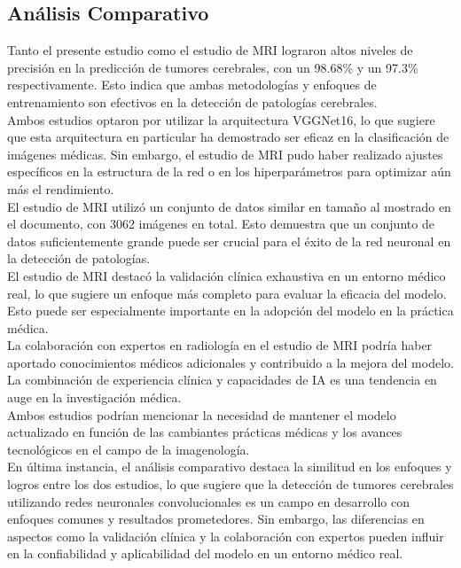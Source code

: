 \documentclass[12pt,twoside,titlepage]{ingenius}
\begin{document}
\begin{multicols}{2}
\subsection{Análisis Comparativo}
Tanto el presente estudio como el estudio de MRI lograron altos niveles de precisión en la predicción de tumores cerebrales, con un 98.68\% y un 97.3\% respectivamente. Esto indica que ambas metodologías y enfoques de entrenamiento son efectivos en la detección de patologías cerebrales.\\

Ambos estudios optaron por utilizar la arquitectura VGGNet16, lo que sugiere que esta arquitectura en particular ha demostrado ser eficaz en la clasificación de imágenes médicas. Sin embargo, el estudio de MRI pudo haber realizado ajustes específicos en la estructura de la red o en los hiperparámetros para optimizar aún más el rendimiento.\\

El estudio de MRI utilizó un conjunto de datos similar en tamaño al mostrado en el documento, con 3062 imágenes en total. Esto demuestra que un conjunto de datos suficientemente grande puede ser crucial para el éxito de la red neuronal en la detección de patologías.\\

El estudio de MRI destacó la validación clínica exhaustiva en un entorno médico real, lo que sugiere un enfoque más completo para evaluar la eficacia del modelo. Esto puede ser especialmente importante en la adopción del modelo en la práctica médica.\\

La colaboración con expertos en radiología en el estudio de MRI podría haber aportado conocimientos médicos adicionales y contribuido a la mejora del modelo. La combinación de experiencia clínica y capacidades de IA es una tendencia en auge en la investigación médica.\\

Ambos estudios podrían mencionar la necesidad de mantener el modelo actualizado en función de las cambiantes prácticas médicas y los avances tecnológicos en el campo de la imagenología.\\

En última instancia, el análisis comparativo destaca la similitud en los enfoques y logros entre los dos estudios, lo que sugiere que la detección de tumores cerebrales utilizando redes neuronales convolucionales es un campo en desarrollo con enfoques comunes y resultados prometedores. Sin embargo, las diferencias en aspectos como la validación clínica y la colaboración con expertos pueden influir en la confiabilidad y aplicabilidad del modelo en un entorno médico real.\\


\end{multicols}
\end{document}
